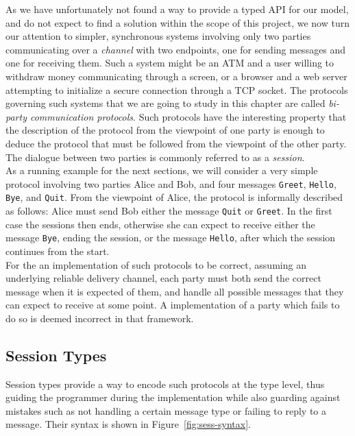 \documentclass[a4paper,twoside]{article}
\newcommand{\RefFig}[1]{Figure~\ref{#1}}
\newcommand{\stt}[1]{\texttt{\small{#1}}}
\begin{document}
As we have unfortunately not found a way to provide a typed API for our model, and do not expect to find a solution within the scope of this project, we now turn our attention to simpler, synchronous systems involving only two parties communicating over a \textit{channel} with two endpoints, one for sending messages and one for receiving them. Such a system might be an ATM and a user willing to withdraw money communicating through a screen, or a browser and a web server attempting to initialize a secure connection through a TCP socket. The protocols governing such systems that we are going to study in this chapter are called \textit{bi-party communication protocols}. Such protocols have the interesting property that the description of the protocol from the viewpoint of one party is enough to deduce the protocol that must be followed from the viewpoint of the other party. The dialogue between two parties is commonly referred to as a \textit{session}.\\

As a running example for the next sections, we will consider a very simple protocol involving two parties Alice and Bob, and four messages \stt{Greet}, \stt{Hello}, \stt{Bye}, and \stt{Quit}.
From the viewpoint of Alice, the protocol is informally described as follows: Alice must send Bob either the message \stt{Quit} or \stt{Greet}. In the first case the sessions then ends, otherwise she can expect to receive either the message \stt{Bye}, ending the session, or the message \stt{Hello}, after which the session continues from the start.\\

For the an implementation of such protocols to be correct, assuming an underlying reliable delivery channel, each party must both send the correct message when it is expected of them, and handle all possible messages that they can expect to receive at some point. A implementation of a party which fails to do so is deemed incorrect in that framework.

\subsection{Session Types}

Session types \cite{Honda:1998:LPT:645392.651876} provide a way to encode such protocols at the type level, thus guiding the programmer during the implementation while also guarding against mistakes such as not handling a certain message type or failing to reply to a message. Their syntax is shown in \RefFig{fig:sess-syntax}.
\end{document}
